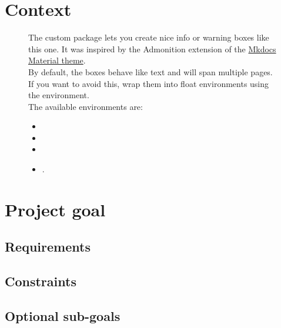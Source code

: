 \chapter{Context}\label{chap:context}

\begin{figure}[ht!]
    \begin{infobox}
        The custom package  lets you create nice info or warning boxes like this one. It was inspired by the Admonition extension of the \href{https://squidfunk.github.io/mkdocs-material/extensions/admonition/}{Mkdocs Material theme}. \\
        By default, the boxes behave like text and will span multiple pages. If you want to avoid this, wrap them into float environments using the  environment. \\
    
        The available environments are:
        \begin{itemize}
            \item {}
            \item {}
            \item {}
            \item {}.
        \end{itemize}
    \end{infobox}
\end{figure}

\lipsum[1-20]

\chapter{Project goal}\label{chap:projectGoal}

\section{Requirements}\label{chap:requirements}

\section{Constraints}\label{chap:constraints}

\section{Optional sub-goals}\label{chap:optGoals}

